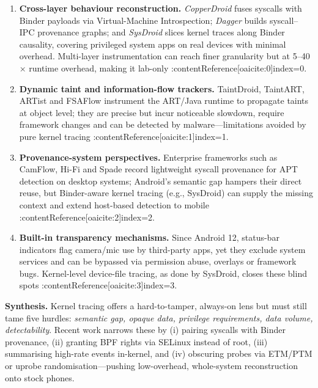 \documentclass[a4paper,12pt]{report}
\begin{document}
\begin{enumerate}[label=(\alph*),resume]
  \item \textbf{Cross-layer behaviour reconstruction.}
        \emph{CopperDroid} fuses syscalls with Binder payloads via Virtual-Machine Introspection; \emph{Dagger} builds syscall–IPC provenance graphs; and \emph{SysDroid} slices kernel traces along Binder causality, covering privileged system apps on real devices with minimal overhead.  Multi-layer instrumentation can reach finer granularity but at 5–40 × runtime overhead, making it lab-only :contentReference[oaicite:0]{index=0}.

  \item \textbf{Dynamic taint and information-flow trackers.}
        TaintDroid, TaintART, ARTist and FSAFlow instrument the ART/Java runtime to propagate taints at object level; they are precise but incur noticeable slowdown, require framework changes and can be detected by malware—limitations avoided by pure kernel tracing :contentReference[oaicite:1]{index=1}.

  \item \textbf{Provenance-system perspectives.}
        Enterprise frameworks such as CamFlow, Hi-Fi and Spade record lightweight syscall provenance for APT detection on desktop systems; Android’s semantic gap hampers their direct reuse, but Binder-aware kernel tracing (e.g., SysDroid) can supply the missing context and extend host-based detection to mobile :contentReference[oaicite:2]{index=2}.

  \item \textbf{Built-in transparency mechanisms.}
        Since Android 12, status-bar indicators flag camera/mic use by third-party apps, yet they exclude system services and can be bypassed via permission abuse, overlays or framework bugs.  Kernel-level device-file tracing, as done by SysDroid, closes these blind spots :contentReference[oaicite:3]{index=3}.
\end{enumerate}

\medskip
\noindent\textbf{Synthesis.}
Kernel tracing offers a hard-to-tamper, always-on lens but must still tame five hurdles: \emph{semantic gap, opaque data, privilege requirements, data volume, detectability}.  Recent work narrows these by (i) pairing syscalls with Binder provenance, (ii) granting BPF rights via SELinux instead of root, (iii) summarising high-rate events in-kernel, and (iv) obscuring probes via ETM/PTM or uprobe randomisation—pushing low-overhead, whole-system reconstruction onto stock phones.
\end{document}
